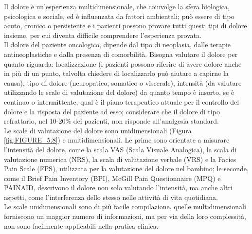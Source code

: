 Il dolore è un’esperienza multidimensionale, che coinvolge la sfera biologica, psicologica e sociale, ed è 
influenzata da fattori ambientali; può essere di tipo acuto, cronico o persistente e i pazienti possono 
provare tutti questi tipi di dolore insieme, per cui diventa difficile comprendere l’esperienza provata\cite{PAINONS}.\\ 
Il dolore del paziente oncologico, dipende dal tipo di neoplasia, dalle terapie antineoplastiche e
dalla presenza di comorbilità. Bisogna valutare il dolore per quanto riguarda: 
localizzazione (i pazienti possono riferire di avere dolore anche in più di un punto, talvolta chiedere di 
localizzarlo può aiutare a capirne la causa), tipo di dolore (neuropatico, somatico o viscerale), intensità 
(da valutare utilizzando le scale di valutazione del dolore) da quanto tempo è insorto, 
se è continuo o intermittente, qual è il piano terapeutico attuale per il controllo del dolore e la risposta 
del paziente ad esso; considerare che il dolore di tipo refrattario, nel 10-20\% dei pazienti, 
non risponde all’analgesia standard\cite{CANCERPAINONS}.\\
Le scale di valutazione del dolore sono unidimensionali (Figura \ref{fig:FIGURE_5.8}) e multidimensionali.
Le prime sono orientate a misurare l'intensità del dolore, come 
la scala VAS (Scala Visuale Analogica), 
la scala di valutazione numerica (NRS),
la scala di valutazione verbale (VRS) e la Facies Pain Scale (FPS), utilizzata
per la valutazione del dolore nel bambino;
le seconde, come il Brief Pain Inventory (BPI), McGill Pain Questionnaire (MPQ) 
e PAINAID, descrivono il dolore non solo valutando l'intensità, ma anche altri aspetti, 
come l'interferenza dello stesso nelle attività di vita quotidiana.\\ Le scale unidimensionali sono di più 
facile compilazione, quelle multidimensionali forniscono un maggior numero di informazioni, ma per via della loro 
complessità, non sono facilmente applicabili nella pratica clinica\cite{BOOK3}.

